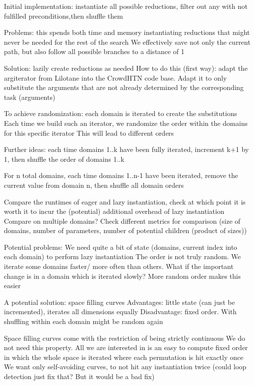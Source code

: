 Initial implementation: instantiate all possible reductions, filter out any with not fulfilled preconditions,then shuffle them

Problems: this spends both time and memory instantiating reductions that might never be needed for the rest of the search
We effectively save not only the current path, but also follow all possible branches to a distance of 1

Solution: lazily create reductions as needed
How to do this (first way):
adapt the argiterator from Lilotane into the CrowdHTN code base. Adapt it to only substitute the arguments that are not already determined by the corresponding task (arguments)

To achieve randomization:
each domain is iterated to create the substitutions
Each time we build such an iterator, we randomize the order within the domains for this specific iterator
This will lead to different orders

Further ideas:
each time domains 1..k have been fully iterated, increment k+1 by 1, then shuffle the order of domains 1..k

For n total domains, each time domains 1..n-1 have been iterated, remove the current value from domain n, then shuffle all domain orders

Compare the runtimes of eager and lazy instantiation, check at which point it is worth it to incur the (potential) additional overhead of lazy instantiation
Compare on multiple domains?
Check different metrics for comparison (size of domains, number of parameters, number of potential children (product of sizes))

Potential problems:
We need quite a bit of state (domains, current index into each domain) to perform lazy instantiation
The order is not truly random. We iterate some domains faster/ more often than others. What if the important change is in a domain which is iterated slowly? More random order makes this easier

A potential solution: space filling curves
Advantages: little state (can just be incremented), iterates all dimensions equally
Disadvantage: fixed order. With shuffling within each domain might be random again

Space filling curves come with the restriction of being strictly continuous
We do not need this property. All we are interested in is an easy to compute fixed order in which the whole space is iterated where each permutation is hit exactly once
We want only self-avoiding curves, to not hit any instantiation twice (could loop detection just fix that? But it would be a bad fix)

